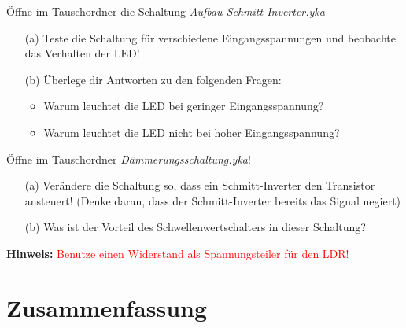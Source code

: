\begin{ZW}
\begin{Aufgabe}
Öffne im Tauschordner die Schaltung \emph{Aufbau Schmitt Inverter.yka}
\begin{itemize}
\item[(a)] Teste die Schaltung für verschiedene Eingangsspannungen und beobachte das Verhalten der LED!
\item[(b)] Überlege dir Antworten zu den folgenden Fragen:
\begin{itemize}
\item Warum leuchtet die LED bei geringer Eingangsspannung?
\item Warum leuchtet die LED nicht bei hoher Eingangsspannung?
\end{itemize}
\end{itemize}
\end{Aufgabe}


\begin{Aufgabe}
Öffne im Tauschordner \emph{Dämmerungsschaltung.yka}!
\begin{itemize}
\item[(a)] Verändere die Schaltung so, dass ein Schmitt-Inverter den Transistor ansteuert! (Denke daran, dass der Schmitt-Inverter bereits das Signal negiert)
\item[(b)] Was ist der Vorteil des Schwellenwertschalters in dieser Schaltung?
\end{itemize}
\textbf{Hinweis:} \textcolor{red}{Benutze einen Widerstand als Spannungsteiler für den LDR!}
\end{Aufgabe}
\end{ZW}


\section*{Zusammenfassung}

